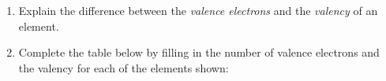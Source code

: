         \label{m38704*id139588}\begin{enumerate}[noitemsep, label=\textbf{\arabic*}. ] 
            \label{m38704*uid10}\item Explain the difference between the \textsl{valence electrons} and the \textsl{valency} of an element.\newline
            
\label{m38704*uid11}\item Complete the table below by filling in the number of valence electrons and the valency for each of the elements shown:

    
      
    
    \setlength\mytablespace{8\tabcolsep}
    \addtolength\mytablespace{5\arrayrulewidth}
    \setlength\mytablewidth{\linewidth}
        
    
    \setlength\mytableroom{\mytablewidth}
    \addtolength\mytableroom{-\mytablespace}
    
    \setlength\myfixedwidth{0pt}
    \setlength\mystarwidth{\mytableroom}
        \addtolength\mystarwidth{-\myfixedwidth}
        \divide{}
        
    
\end{enumerate}
